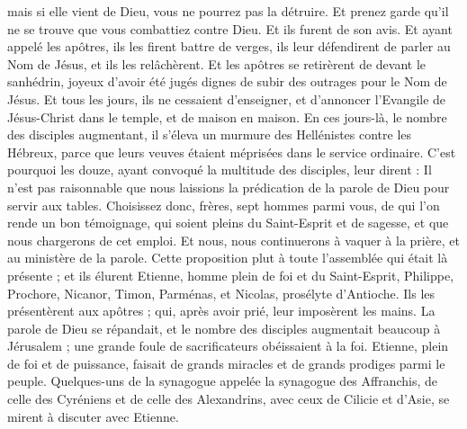 \begin{multicols}{2}
mais si elle vient de Dieu, vous ne pourrez pas la détruire. Et prenez garde qu’il ne se trouve que vous combattiez contre Dieu.
Et ils furent de son avis. Et ayant appelé les apôtres, ils les firent battre de verges, ils leur défendirent de parler au Nom de Jésus, et ils les relâchèrent.
Et les apôtres se retirèrent de devant le sanhédrin, joyeux d'avoir été jugés dignes de subir des outrages pour le Nom de Jésus.
Et tous les jours, ils ne cessaient d'enseigner, et d'annoncer l’Evangile de Jésus-Christ dans le temple, et de maison en maison.
\VerseOne{}En ces jours-là, le nombre des disciples augmentant, il s'éleva un murmure des Hellénistes contre les Hébreux, parce que leurs veuves étaient méprisées dans le service ordinaire.
C'est pourquoi les douze, ayant convoqué la multitude des disciples, leur dirent : Il n'est pas raisonnable que nous laissions la prédication de la parole de Dieu pour servir aux tables.
Choisissez donc, frères, sept hommes parmi vous, de qui l’on rende un bon témoignage, qui soient pleins du Saint-Esprit et de sagesse, et que nous chargerons de cet emploi.
Et nous, nous continuerons à vaquer à la prière, et au ministère de la parole.
Cette proposition plut à toute l'assemblée qui était là présente ; et ils élurent Etienne, homme plein de foi et du Saint-Esprit, Philippe, Prochore, Nicanor, Timon, Parménas, et Nicolas, prosélyte d'Antioche.
Ils les présentèrent aux apôtres ; qui, après avoir prié, leur imposèrent les mains.
La parole de Dieu se répandait, et le nombre des disciples augmentait beaucoup à Jérusalem ; une grande foule de sacrificateurs obéissaient à la foi.
Etienne, plein de foi et de puissance, faisait de grands miracles et de grands prodiges parmi le peuple.
Quelques-uns de la synagogue appelée la synagogue des Affranchis, de celle des Cyréniens et de celle des Alexandrins, avec ceux de Cilicie et d'Asie, se mirent à discuter avec Etienne.

\end{multicols}
